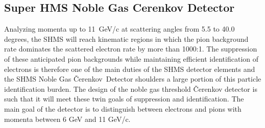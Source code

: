 \documentclass[11pt]{article}
\newcommand{\Cerenkov}{\v{C}erenkov}
\begin{document}



\subsection{Super HMS Noble Gas Cerenkov Detector}
Analyzing momenta up to
11~GeV/c at scattering angles from 5.5 to 40.0  degrees, the SHMS will reach
kinematic regions in which the pion background  rate dominates the scattered electron
rate by more than 1000:1.  The  suppression of these anticipated pion backgrounds
while maintaining efficient identification of electrons  is therefore one
of the main duties of  the SHMS detector elements and the SHMS Noble Gas \Cerenkov\ Detector shoulders a large portion of this particle identification burden.
The design of the  noble gas threshold \v Cerenkov
detector is such that it will meet these twin goals of suppression and identification.
The main goal of the detector is to distinguish between electrons and pions with momenta between 6 GeV and 11 GeV/c. 
\end{document}
